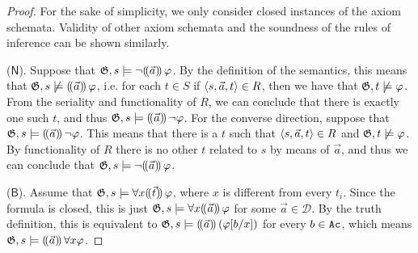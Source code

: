 \documentclass[sigconf,anonymous]{aamas}
\begin{document}
\begin{proof}
 For the sake of simplicity, we only consider closed instances of the axiom schemata. Validity of other axiom schemata and the soundness of the rules of inference can be shown similarly.
 
 ($\mathsf{N}$). Suppose that $\mathfrak{G},s\models \neg (\!( \vec{{a}} )\!)\,\varphi$. By the definition of the semantics, this means that $\mathfrak{G},s\not \models (\!( \vec{{a}} )\!)\, \varphi$, i.e. for each   $t\in S$ if   $\langle s,\vec{a},t \rangle\in R$,  then we have that $\mathfrak{G},t\not\models \varphi$. From the seriality and functionality of $R$, we can conclude that there is exactly one such $t$, and thus $\mathfrak{G},s\models (\!( \vec{{a}} )\!)\,\neg \varphi $. For the converse direction, suppose that $\mathfrak{G},s\models (\!( \vec{{a}} )\!)\,\neg \varphi$. This means that there is a $t$ such that $\langle s,\vec{a},t \rangle\in R$ and $\mathfrak{G},t\not\models \varphi$. By functionality of $R$ there is no other $t$ related to $s$ by means of $\vec{a}$, and thus we can conclude that $\mathfrak{G},s\models \neg (\!( \vec{{a}} )\!)\,\varphi$. 

 ($\mathsf{B}$). Assume that $\mathfrak{G},s \models \forall x (\!( \vec t )\!)\, \varphi$, where $x$ is different from every $t_i$. Since the formula is closed, this is just $\mathfrak{G},s \models \forall x (\!( \vec{ {a}} )\!)\, \varphi$ for some $\vec{a}\in \mathcal D$. By the truth definition, this is equivalent to $\mathfrak{G},s \models (\!( \vec{{a}} )\!)\, (\varphi [{b}/x])$ for every $b\in \texttt{Ac}$, which means $\mathfrak{G},s\models (\!( \vec{ a} )\!)\, \forall x \varphi $.
\end{proof}
\end{document}

